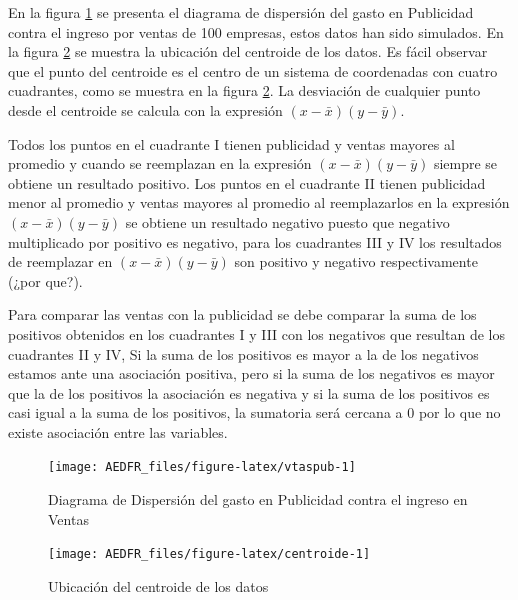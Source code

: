 \documentclass[letterpaper,]{book}
\begin{document}
En la figura \ref{fig:vtaspub} se presenta el diagrama de dispersión del gasto en Publicidad contra el ingreso por ventas de 100 empresas, estos datos han sido simulados. En la figura \ref{fig:centroide} se muestra la ubicación del centroide de los datos. Es fácil observar que el punto del centroide es el centro de un sistema de coordenadas con cuatro cuadrantes, como se muestra en la figura \ref{fig:centroide}. La desviación de cualquier punto desde el centroide se calcula con la expresión \(\left(x-\bar{x}\right)\left(y-\bar{y}\right)\).

Todos los puntos en el cuadrante I tienen publicidad y ventas mayores al promedio y cuando se reemplazan en la expresión \(\left(x-\bar{x}\right)\left(y-\bar{y}\right)\) siempre se obtiene un resultado positivo. Los puntos en el cuadrante II tienen publicidad menor al promedio y ventas mayores al promedio al reemplazarlos en la expresión \(\left(x-\bar{x}\right)\left(y-\bar{y}\right)\) se obtiene un resultado negativo puesto que negativo multiplicado por positivo es negativo, para los cuadrantes III y IV los resultados de reemplazar en \(\left(x-\bar{x}\right)\left(y-\bar{y}\right)\) son positivo y negativo respectivamente (¿por que?).

Para comparar las ventas con la publicidad se debe comparar la suma de los positivos obtenidos en los cuadrantes I y III con los negativos que resultan de los cuadrantes II y IV, Si la suma de los positivos es mayor a la de los negativos estamos ante una asociación positiva, pero si la suma de los negativos es mayor que la de los positivos la asociación es negativa y si la suma de los positivos es casi igual a la suma de los positivos, la sumatoria será cercana a \(0\) por lo que no existe asociación entre las variables.

\begin{figure}[h]

{\centering \texttt{[image: AEDFR\_files/figure-latex/vtaspub-1]} 

}

\caption{Diagrama de Dispersión del gasto en Publicidad contra el ingreso en Ventas}\label{fig:vtaspub}
\end{figure}

\begin{figure}[h]

{\centering \texttt{[image: AEDFR\_files/figure-latex/centroide-1]} 

}

\caption{Ubicación del centroide de los datos}\label{fig:centroide}
\end{figure}
\end{document}
